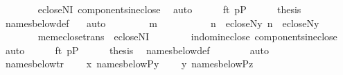 \begin{isabellebody}
\ \ \ \ \ \ \isamarkupfalse%
\ ecloseNI\ components{\isacharunderscore}{\kern0pt}in{\isacharunderscore}{\kern0pt}eclose\ \isamarkupfalse%
\ auto\isanewline
\ \ \ \ \isamarkupfalse%
\ {\isacartoucheopen}ft{\isasymin}{}{\isacartoucheclose}\ {\isacartoucheopen}p{\isasymin}P{\isacartoucheclose}\isanewline
\ \ \ \ \isamarkupfalse%
\ {\isacharquery}{\kern0pt}thesis\ \isamarkupfalse%
\ names{\isacharunderscore}{\kern0pt}below{\isacharunderscore}{\kern0pt}def\ \isamarkupfalse%
\ \ auto\isanewline
\ \ \isamarkupfalse%
\isanewline
\ \ \ \ \isamarkupfalse%
\ m\isanewline
\ \ \ \ \isamarkupfalse%
\isanewline
\ \ \ \ \isamarkupfalse%
\ {\isachardoublequoteopen}n{}\ {\isasymin}\ ecloseN{\isacharparenleft}{\kern0pt}{\isacharquery}{\kern0pt}y{\isacharparenright}{\kern0pt}{\isachardoublequoteclose}\ {\isachardoublequoteopen}n{}\ {\isasymin}\ ecloseN{\isacharparenleft}{\kern0pt}{\isacharquery}{\kern0pt}y{\isacharparenright}{\kern0pt}{\isachardoublequoteclose}\isanewline
\ \ \ \ \ \ \isamarkupfalse%
\ mem{\isacharunderscore}{\kern0pt}eclose{\isacharunderscore}{\kern0pt}trans\ \ ecloseNI\isanewline
\ \ \ \ \ \ \ \ in{\isacharunderscore}{\kern0pt}dom{\isacharunderscore}{\kern0pt}in{\isacharunderscore}{\kern0pt}eclose\ components{\isacharunderscore}{\kern0pt}in{\isacharunderscore}{\kern0pt}eclose\ \isamarkupfalse%
\ auto\isanewline
\ \ \ \ \isamarkupfalse%
\ {\isacartoucheopen}ft{\isasymin}{}{\isacartoucheclose}\ {\isacartoucheopen}p{\isasymin}P{\isacartoucheclose}\isanewline
\ \ \ \ \isamarkupfalse%
\ {\isacharquery}{\kern0pt}thesis\ \isamarkupfalse%
\ names{\isacharunderscore}{\kern0pt}below{\isacharunderscore}{\kern0pt}def\isanewline
\ \ \ \ \ \ \isamarkupfalse%
\ auto\isanewline
\ \ \isamarkupfalse%
\isanewline
{}\isamarkupfalse%
%
\endisatagproof
{\isafoldproof}%
%
\isadelimproof
\isanewline
%
\endisadelimproof
\isanewline
{}\isamarkupfalse%
\ names{\isacharunderscore}{\kern0pt}below{\isacharunderscore}{\kern0pt}tr\ {\isacharcolon}{\kern0pt}\isanewline
\ \ \ {\isachardoublequoteopen}x{\isasymin}\ names{\isacharunderscore}{\kern0pt}below{\isacharparenleft}{\kern0pt}P{\isacharcomma}{\kern0pt}y{\isacharparenright}{\kern0pt}{\isachardoublequoteclose}\isanewline
\ \ \ \ {\isachardoublequoteopen}y{\isasymin}\ names{\isacharunderscore}{\kern0pt}below{\isacharparenleft}{\kern0pt}P{\isacharcomma}{\kern0pt}z{\isacharparenright}{\kern0pt}{\isachardoublequoteclose}\isanewline

\end{isabellebody}
